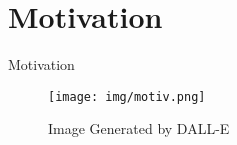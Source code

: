 \section{Motivation}

\begin{frame}{Motivation}
    \begin{figure}
        \centering
        \texttt{[image: img/motiv.png]}
        \caption{Image Generated by DALL-E}
      \end{figure}
\end{frame}
